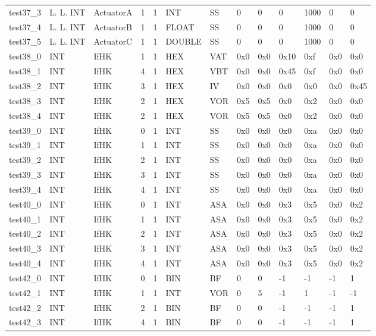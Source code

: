 \begin{longtable}{|l|l|l|p{0.5cm}|p{0.5cm}|l|p{0.5cm}|p{0.5cm}|p{0.5cm}|l|l|p{0.5cm}|l|}
test37\_3 & L. L. INT & ActuatorA & 1 & 1 & INT & SS & 0 & 0 & 0 & 1000 & 0 & 0 \\
test37\_4 & L. L. INT & ActuatorB & 1 & 1 & FLOAT & SS & 0 & 0 & 0 & 1000 & 0 & 0 \\
test37\_5 & L. L. INT & ActuatorC & 1 & 1 & DOUBLE & SS & 0 & 0 & 0 & 1000 & 0 & 0 \\
test38\_0 & INT & IfHK & 1 & 1 & HEX & VAT & 0x0 & 0x0 & 0x10 & 0xf & 0x0 & 0x0 \\
test38\_1 & INT & IfHK & 4 & 1 & HEX & VBT & 0x0 & 0x0 & 0x45 & 0xf & 0x0 & 0x0 \\
test38\_2 & INT & IfHK & 3 & 1 & HEX & IV & 0x0 & 0x0 & 0x0 & 0x0 & 0x0 & 0x45 \\
test38\_3 & INT & IfHK & 2 & 1 & HEX & VOR & 0x5 & 0x5 & 0x0 & 0x2 & 0x0 & 0x0 \\
test38\_4 & INT & IfHK & 2 & 1 & HEX & VOR & 0x5 & 0x5 & 0x0 & 0x2 & 0x0 & 0x0 \\
test39\_0 & INT & IfHK & 0 & 1 & INT & SS & 0x0 & 0x0 & 0x0 & 0xa & 0x0 & 0x0 \\
test39\_1 & INT & IfHK & 1 & 1 & INT & SS & 0x0 & 0x0 & 0x0 & 0xa & 0x0 & 0x0 \\
test39\_2 & INT & IfHK & 2 & 1 & INT & SS & 0x0 & 0x0 & 0x0 & 0xa & 0x0 & 0x0 \\
test39\_3 & INT & IfHK & 3 & 1 & INT & SS & 0x0 & 0x0 & 0x0 & 0xa & 0x0 & 0x0 \\
test39\_4 & INT & IfHK & 4 & 1 & INT & SS & 0x0 & 0x0 & 0x0 & 0xa & 0x0 & 0x0 \\
test40\_0 & INT & IfHK & 0 & 1 & INT & ASA & 0x0 & 0x0 & 0x3 & 0x5 & 0x0 & 0x2 \\
test40\_1 & INT & IfHK & 1 & 1 & INT & ASA & 0x0 & 0x0 & 0x3 & 0x5 & 0x0 & 0x2 \\
test40\_2 & INT & IfHK & 2 & 1 & INT & ASA & 0x0 & 0x0 & 0x3 & 0x5 & 0x0 & 0x2 \\
test40\_3 & INT & IfHK & 3 & 1 & INT & ASA & 0x0 & 0x0 & 0x3 & 0x5 & 0x0 & 0x2 \\
test40\_4 & INT & IfHK & 4 & 1 & INT & ASA & 0x0 & 0x0 & 0x3 & 0x5 & 0x0 & 0x2 \\
test42\_0 & INT & IfHK & 0 & 1 & BIN & BF & 0 & 0 & -1 & -1 & -1 & 1 \\
test42\_1 & INT & IfHK & 1 & 1 & INT & VOR & 0 & 5 & -1 & 1 & -1 & -1 \\
test42\_2 & INT & IfHK & 2 & 1 & BIN & BF & 0 & 0 & -1 & -1 & -1 & 1 \\
test42\_3 & INT & IfHK & 4 & 1 & BIN & BF & 0 & 0 & -1 & -1 & -1 & 1 \\

\end{longtable}
